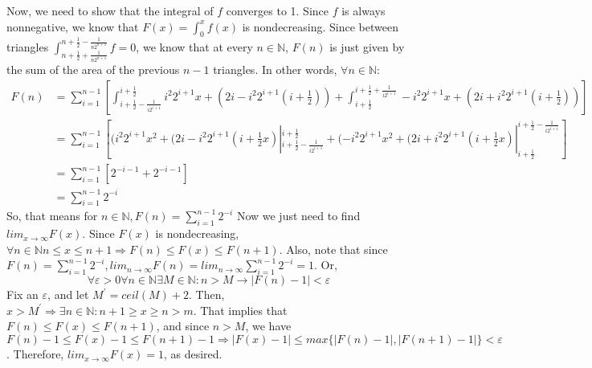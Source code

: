 \documentclass{article}
\begin{document}
Now, we need to show that the integral of $f$ converges to 1. Since $f$ is always nonnegative, we know that $F(x) = \int_{0}^{x} f(x)$ is nondecreasing. Since between triangles $\int_{n+\frac{1}{2} + \frac{1}{n2^{n+1}}}^{n+\frac{1}{2} - \frac{1}{n2^{n+1}}} f = 0$,  we know that at every $n \in \mathbb{N}$, $F(n)$ is just given by the sum of the area of the previous $n-1$ triangles. In other words, $\forall n \in \mathbb{N}$:
\begin{align*}
F(n) &= \sum_{i=1}^{n-1}\left[
\int_{i + \frac{1}{2} - \frac{1}{i2^{i+1}}}^{i+\frac{1}{2}} i^{2}2^{i+1}x + (2i - i^{2}2^{i+1}(i+\frac{1}{2})) +
\int_{i+\frac{1}{2}}^{i + \frac{1}{2} + \frac{1}{i2^{i+1}}}-i^{2}2^{i+1}x + (2i + i^{2}2^{i+1}(i+\frac{1}{2}))\right]\\
&= \sum_{i=1}^{n-1}\left[
(i^{2}2^{i+1}x^{2} + (2i - i^{2}2^{i+1}(i+\frac{1}{2}x)|_{i + \frac{1}{2} - \frac{1}{i2^{i+1}}}^{i + \frac{1}{2}} + 
(-i^{2}2^{i+1}x^{2} + (2i + i^{2}2^{i+1}(i+\frac{1}{2}x)|_{i + \frac{1}{2}}^{i + \frac{1}{2} - \frac{1}{i2^{i+1}}} \right]\\
&=\sum_{i=1}^{n-1}\left[2^{-i - 1} + 2^{-i - 1} \right]\\
&=\sum_{i=1}^{n-1} 2^{-i}
\end{align*} 
So, that means for $n \in \mathbb{N}, F(n) = \sum_{i=1}^{n-1} 2^{-i}$
Now we just need to find $lim_{x\rightarrow \infty} F(x)$.
Since $F(x)$ is nondecreasing, $\forall n \in \mathbb{N} n\leq x \leq n+1 \Rightarrow F(n) \leq F(x) \leq F(n+1)$. Also, note that since $F(n) = \sum_{i=1}^{n-1} 2^{-i}, lim_{n\rightarrow \infty} F(n) = lim_{n\rightarrow \infty} \sum_{i=1}^{n-1} 2^{-i} = 1$. Or, 
\begin{equation*}
\forall \varepsilon>0 \forall n \in \mathbb{N} \exists M \in \mathbb{N}: n>M \rightarrow |F(n) - 1| < \varepsilon
\end{equation*}
Fix an $\varepsilon$, and let $M^{\prime} = ceil(M) + 2$. Then, $x>M^{\prime} \Rightarrow \exists n \in \mathbb{N}: n+1\geq x\geq n > m$. That implies that $F(n) \leq F(x) \leq F(n+1)$, and since $n>M$, we have $F(n) - 1 \leq F(x) - 1 \leq F(n+1) - 1 \Rightarrow |F(x) - 1| \leq max\{|F(n) - 1|, |F(n+1) - 1|\} < \varepsilon$. Therefore, $lim_{x \rightarrow \infty} F(x) = 1$, as desired.
\end{document}
